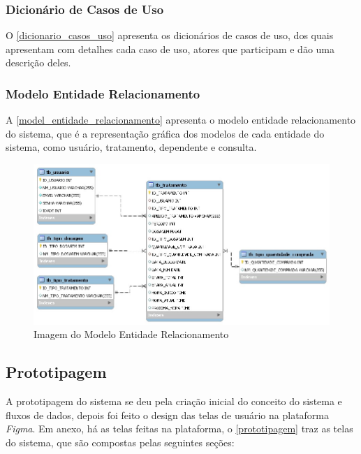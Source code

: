 \documentclass[
	article,			%
	12pt,				%
	oneside,			%
	a4paper,			%
    BIBLATEX,           %
	english,			%
	brazil,				%
	sumario=tradicional
	]{abntex2}
\begin{document}
\subsubsection{Dicionário de Casos de Uso}

O \autoref{dicionario_casos_uso} apresenta os dicionários de casos de uso, dos quais apresentam com detalhes cada caso de uso, atores que participam e dão uma descrição deles.

\subsubsection{Modelo Entidade Relacionamento}

A \autoref{model_entidade_relacionamento} apresenta o modelo entidade relacionamento do sistema, que é a representação gráfica dos modelos de cada entidade do sistema, como usuário, tratamento, dependente e consulta.

\begin{figure}[!htbp]
    \centering
    \includegraphics[width=1.0\linewidth]{Figuras/bancoDados.jpg}
    \caption{Imagem do Modelo Entidade Relacionamento}
    \label{model_entidade_relacionamento}
\end{figure}

\subsection{Prototipagem}

A prototipagem do sistema se deu pela criação inicial do conceito do sistema e fluxos de dados, depois foi feito o design das telas de usuário na plataforma \textit{Figma}. Em anexo, há as telas feitas na plataforma, o \autoref{prototipagem} traz as telas do sistema, que são compostas pelas seguintes seções:
\end{document}
